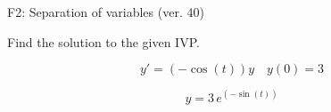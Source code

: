 \begin{exercise}
  \begin{exerciseTitle}F2: Separation of variables (ver. 40)\end{exerciseTitle}
  \begin{exerciseStatement}
    
Find the solution to the given IVP.

    
\[y'=( -\cos\left(t\right) )y\hspace{1em} y(0)= 3\]

  \end{exerciseStatement}
  \begin{exerciseAnswer}
    
\[y= 3 \, e^{\left(-\sin\left(t\right)\right)}\]

  \end{exerciseAnswer}
\end{exercise}
